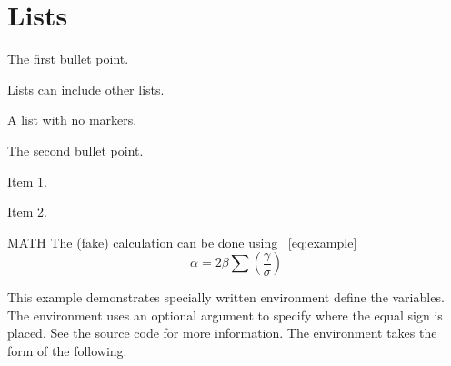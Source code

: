 \section{Lists}
\begin{bulletedlist}
	\item The first bullet point.
	\begin{bulletedlist}
		\item Lists can include other lists.
		\begin{plainlist}
			\item A list with no markers.
		\end{plainlist}
	\end{bulletedlist}
	\item The second bullet point.
	\begin{numberedlist}
		\item Item 1.
		\item Item 2.
	\end{numberedlist}
\end{bulletedlist}

 MATH
The (fake) calculation can be done using \equationname~\ref{eq:example}
\begin{equation}
	\alpha = 2\beta\sum \left( \frac{\gamma}{\sigma} \right)
	\label{eq:example}
\end{equation}
\begin{mathwhere}[0.3in] %
\end{mathwhere}
This example demonstrates specially written  environment define the variables.  The  environment uses an optional argument to specify where the equal sign is placed.  See the source code for more information.  The environment takes the form of the following.
\begin{plainlist}
	\item {}
	\begin{plainlist}
		\item {}
	\end{plainlist}
	\item {}
\end{plainlist}
\begin{mathwhere}[0.85in]
\end{mathwhere}

